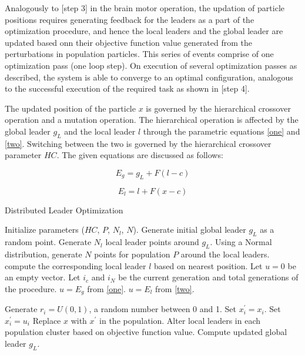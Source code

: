 \documentclass[conference]{IEEEtran}
\begin{document}
Analogously to [step 3] in the brain motor operation, the updation of particle positions requires generating feedback for the leaders as a part of the optimization procedure, and hence the local leaders and the global leader are updated based onn their objective function value generated from the perturbations in population particles. This series of events comprise of one optimization pass (one loop step). On execution of several optimization passes as described, the system is able to converge to an optimal configuration, analogous to the successful execution of the required task as shown in [step 4].

The updated position of the particle $x$ is governed by the hierarchical crossover operation and a mutation operation. The hierarchical operation is affected by the global leader $g_L$ and the local leader $l$ through the parametric equations \eqref{one} and \eqref{two}. Switching between the two is governed by the hierarchical crossover parameter $HC$. The given equations are discussed as follows:

\begin{equation}
\label{one}
E_g = g_L + F (l - c)
\end{equation}

\begin{equation}
\label{two}
E_l = l + F (x - c)
\end{equation}

\begin{algorithm}
\caption{Distributed Leader Optimization}
\label{algo}
\begin{algorithmic}[1]
		\State Initialize parameters ($HC$, $P$, $N_l$, $N$).
		\State Generate initial global leader $g_L$ as a random point.
		\State Generate $N_l$ local leader points around $g_L$.
		\State Using a Normal distribution, generate $N$ points for population $P$ around the local leaders.
				\State compute the corresponding local leader $l$ based on nearest position.
				\State Let $u = 0$ be an empty vector.
				\State Let $i_c$ and $i_N$ be the current generation and total generations of the procedure.
					\State $u = E_g$ from \eqref{one}.
				\Else
					\State $u = E_l$ from \eqref{two}.
				\EndIf
				
					\State Generate $r_i = U(0, 1)$, a random number between 0 and 1.
						\State Set $x_i^{'} = x_i$.
					\Else
						\State Set $x_i^{'} = u_i$
					\EndIf
				\EndFor
					\State Replace $x$ with $x^{'}$ in the population.
				\EndIf
			\EndFor
			\State Alter local leaders in each population cluster based on objective function value.
			\State Compute updated global leader $g_L$.
		\EndWhile
	\EndProcedure
\end{algorithmic}
\end{algorithm}
\end{document}
